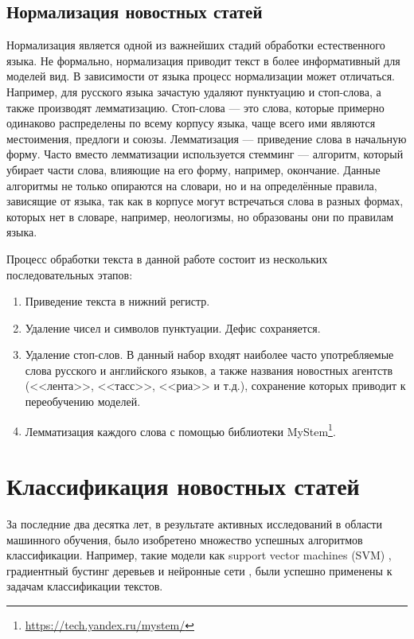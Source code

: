 \documentclass[a4paper, 14pt]{extarticle}
\begin{document}
\subsection{Нормализация новостных статей}
Нормализация является одной из важнейших стадий обработки естественного языка. Не формально, нормализация приводит текст в 
более информативный для моделей вид. В зависимости от языка процесс нормализации может отличаться. Например, для русского языка
зачастую удаляют пунктуацию и стоп-слова, а также производят лемматизацию. Стоп-слова --- это слова, которые примерно 
одинаково распределены по всему корпусу языка, чаще всего ими являются местоимения, предлоги и союзы. Лемматизация --- 
приведение слова в начальную форму. Часто вместо лемматизации используется стемминг --- алгоритм, который убирает части 
слова, влияющие на его форму, например, окончание. Данные алгоритмы не только опираются на словари, но и на 
определённые правила, зависящие от языка, так как в корпусе могут встречаться слова в разных формах, которых нет в 
словаре, например, неологизмы, но образованы они по правилам языка.

Процесс обработки текста в данной работе состоит из нескольких последовательных этапов:
\begin{enumerate}
	\item Приведение текста в нижний регистр.
	\item Удаление чисел и символов пунктуации. Дефис сохраняется.
	\item Удаление стоп-слов. В данный набор входят наиболее часто употребляемые слова русского и английского языков,
	а также названия новостных агентств (<<лента>>, <<тасс>>, <<риа>> и т.д.), сохранение которых приводит к 
	переобучению моделей.
	\item Лемматизация каждого слова с помощью библиотеки MyStem\footnote{\url{https://tech.yandex.ru/mystem/}}.
\end{enumerate}

\section{Классификация новостных статей}
За последние два десятка лет, в результате активных исследований в области машинного обучения,
было изобретено множество успешных алгоритмов классификации. Например, такие модели как support vector machines (SVM) \cite{weston99svms},
градиентный бустинг деревьев и нейронные сети \cite{DBLP:journals/corr/ConneauSBL16}, были успешно применены к задачам классификации текстов.
\end{document}
